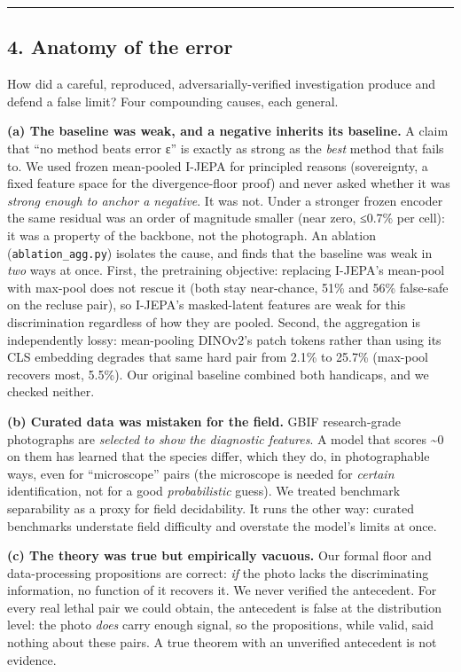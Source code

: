 \begin{center}\rule{0.5\linewidth}{0.5pt}\end{center}

\subsection{4. Anatomy of the error}\label{anatomy-of-the-error}

How did a careful, reproduced, adversarially-verified investigation
produce and defend a false limit? Four compounding causes, each general.

\textbf{(a) The baseline was weak, and a negative inherits its
baseline.} A claim that ``no method beats error ε'' is exactly as strong
as the \emph{best} method that fails to. We used frozen mean-pooled
I-JEPA for principled reasons (sovereignty, a fixed feature space for
the divergence-floor proof) and never asked whether it was \emph{strong
enough to anchor a negative}. It was not. Under a stronger frozen
encoder the same residual was an order of magnitude smaller (near zero,
≤0.7\% per cell): it was a property of the backbone, not the photograph.
An ablation (\texttt{ablation\_agg.py}) isolates the cause, and finds
that the baseline was weak in \emph{two} ways at once. First, the
pretraining objective: replacing I-JEPA's mean-pool with max-pool does
not rescue it (both stay near-chance, 51\% and 56\% false-safe on the
recluse pair), so I-JEPA's masked-latent features are weak for this
discrimination regardless of how they are pooled. Second, the
aggregation is independently lossy: mean-pooling DINOv2's patch tokens
rather than using its CLS embedding degrades that same hard pair from
2.1\% to 25.7\% (max-pool recovers most, 5.5\%). Our original baseline
combined both handicaps, and we checked neither.

\textbf{(b) Curated data was mistaken for the field.} GBIF
research-grade photographs are \emph{selected to show the diagnostic
features}. A model that scores \textasciitilde0 on them has learned that
the species differ, which they do, in photographable ways, even for
``microscope'' pairs (the microscope is needed for \emph{certain}
identification, not for a good \emph{probabilistic} guess). We treated
benchmark separability as a proxy for field decidability. It runs the
other way: curated benchmarks understate field difficulty and overstate
the model's limits at once.

\textbf{(c) The theory was true but empirically vacuous.} Our formal
floor and data-processing propositions are correct: \emph{if} the photo
lacks the discriminating information, no function of it recovers it. We
never verified the antecedent. For every real lethal pair we could
obtain, the antecedent is false at the distribution level: the photo
\emph{does} carry enough signal, so the propositions, while valid, said
nothing about these pairs. A true theorem with an unverified antecedent
is not evidence.

